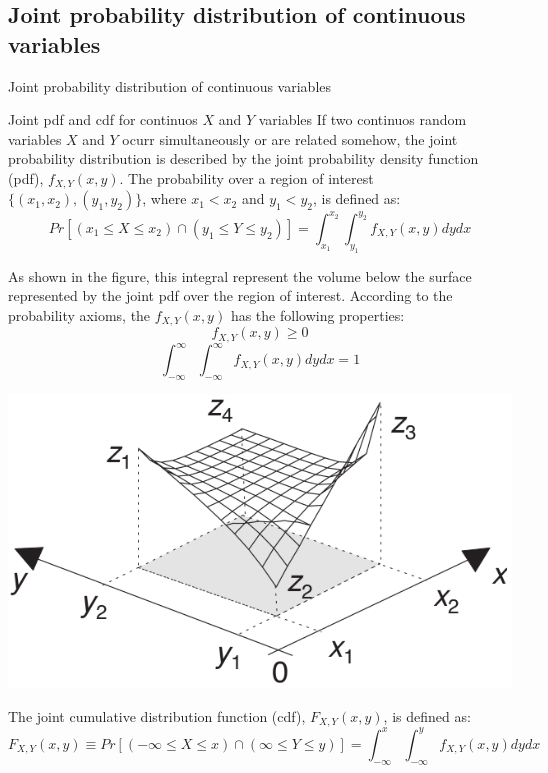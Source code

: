 \documentclass[8pt]{beamer}
\renewcommand{\emph}[1]{\textcolor{myorange}{#1}}
\begin{document}
\subsection{Joint probability distribution of continuous variables} %

\begin{frame}{Joint probability distribution of continuous variables}

    \begin{block}{Joint pdf and cdf for continuos $X$ and $Y$ variables}
        If two continuos random variables $X$ and $Y$ ocurr simultaneously or are related somehow, the joint probability distribution is described by the \alert{joint probability density function} (\emph{pdf}), $f_{X,Y} (x,y)$. The probability over a region of interest $\{(x_1, x_2), (y_1, y_2)\}$, where $x_1 < x_2$ and $y_1 < y_2$, is defined as:
        \[
            \displaystyle
            Pr[(x_1\leq X \leq x_2) \cap (y_1\leq Y \leq y_2)] = \int_{x_1}^{x_2} \int_{y_1}^{y_2} f_{X,Y} (x,y) dy dx
        \]

\begin{minipage}{0.49\textwidth}
        As shown in the figure, this integral represent the volume below the surface represented by the joint \emph{pdf} over the region of interest. 
        According to the probability axioms, the $f_{X,Y} (x,y)$ has the following properties:
        \[
            \displaystyle
            f_{X,Y} (x, y) \geq 0
        \]
        \[
            \displaystyle
        \int_{-\infty}^{\infty} \int_{-\infty}^{\infty} f_{X,Y} (x,y) dy dx = 1
        \]
\end{minipage}
\begin{minipage}{0.49\textwidth}
    
         \includegraphics[width=\linewidth]{fi333.png}        

\end{minipage}
The \alert{joint cumulative distribution function} (\emph{cdf}), $F_{X,Y} (x,y)$, is defined as:
        \[
            \displaystyle
            F_{X,Y} (x,y) \equiv Pr[(-\infty \leq X \leq x) \cap (\infty \leq Y \leq y)] = \int_{-\infty}^{x} \int_{-\infty}^{y} f_{X,Y} (x,y) dy dx
        \]

   \end{block}
\end{frame}
\end{document}

